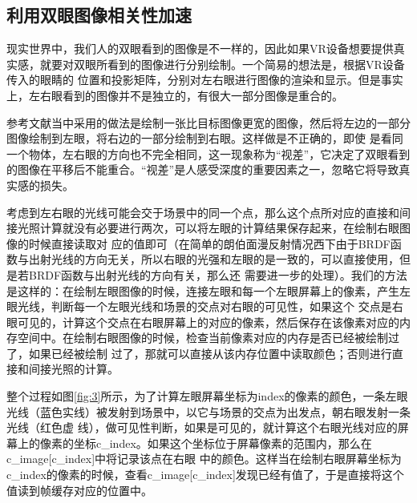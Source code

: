 \documentclass[UTF8]{ctexart}
\begin{document}
    \subsection{利用双眼图像相关性加速}
        现实世界中，我们人的双眼看到的图像是不一样的，因此如果VR设备想要提供真实感，就要对双眼所看到的图像进行分别绘制。一个简易的想法是，根据VR设备传入的眼睛的
        位置和投影矩阵，分别对左右眼进行图像的渲染和显示。但是事实上，左右眼看到的图像并不是独立的，有很大一部分图像是重合的。
        
        参考文献\cite{fujita2014foveated}当中采用的做法是绘制一张比目标图像更宽的图像，然后将左边的一部分图像绘制到左眼，将右边的一部分绘制到右眼。这样做是不正确的，即使
        是看同一个物体，左右眼的方向也不完全相同，这一现象称为“视差”，它决定了双眼看到的图像在平移后不能重合。“视差”是人感受深度的重要因素之一，忽略它将导致真实感的损失。
        
        考虑到左右眼的光线可能会交于场景中的同一个点，那么这个点所对应的直接和间接光照计算就没有必要进行两次，可以将左眼的计算结果保存起来，在绘制右眼图像的时候直接读取对
        应的值即可（在简单的朗伯面漫反射情况西下由于BRDF函数与出射光线的方向无关，所以右眼的光强和左眼的是一致的，可以直接使用，但是若BRDF函数与出射光线的方向有关，那么还
        需要进一步的处理）。我们的方法是这样的：在绘制左眼图像的时候，连接左眼和每一个左眼屏幕上的像素，产生左眼光线，判断每一个左眼光线和场景的交点对右眼的可见性，如果这个
        交点是右眼可见的，计算这个交点在右眼屏幕上的对应的像素，然后保存在该像素对应的内存空间中。在绘制右眼图像的时候，检查当前像素对应的内存是否已经被绘制过了，如果已经被绘制
        过了，那就可以直接从该内存位置中读取颜色；否则进行直接和间接光照的计算。
        
        整个过程如图\ref{fig:3}所示，为了计算左眼屏幕坐标为index的像素的颜色，一条左眼光线（蓝色实线）被发射到场景中，以它与场景的交点为出发点，朝右眼发射一条光线（红色虚
        线），做可见性判断，如果是可见的，就计算这个右眼光线对应的屏幕上的像素的坐标c\_index。如果这个坐标位于屏幕像素的范围内，那么在c\_image[c\_index]中将记录该点在右眼
        中的颜色。这样当在绘制右眼屏幕坐标为c\_index的像素的时候，查看c\_image[c\_index]发现已经有值了，于是直接将这个值读到帧缓存对应的位置中。
        
\end{document}
